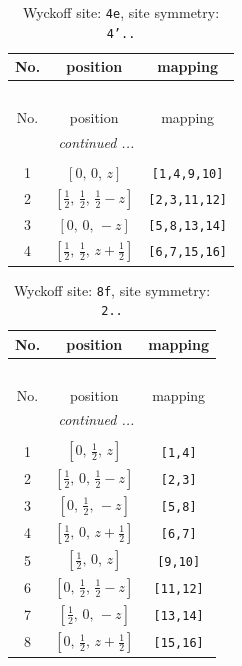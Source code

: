 \documentclass[fleqn,8pt]{jsarticle}
\begin{document}
\renewcommand{\arraystretch}{1.2}
\begin{longtable}{ccc}
\caption{Wyckoff site: {\tt 4e}, site symmetry: {\tt 4'..}}
 \\
 \hline \hline
No. & position & mapping \\ \hline \endfirsthead

\multicolumn{2}{l}{\tablename\ \thetable{}} \\
 \hline \hline
No. & position & mapping \\ \hline \endhead

 \hline \hline
\multicolumn{2}{r}{\footnotesize\it continued ...} \\ \endfoot

 \hline \hline
\multicolumn{2}{r}{} \\ \endlastfoot

1 & $\left[ 0,\, 0,\, z \right]$ & {\tt [1,4,9,10]} \\ \hline
2 & $\left[ \frac{1}{2},\, \frac{1}{2},\, \frac{1}{2} - z \right]$ & {\tt [2,3,11,12]} \\ \hline
3 & $\left[ 0,\, 0,\, - z \right]$ & {\tt [5,8,13,14]} \\ \hline
4 & $\left[ \frac{1}{2},\, \frac{1}{2},\, z + \frac{1}{2} \right]$ & {\tt [6,7,15,16]} \\
\end{longtable}
\renewcommand{\arraystretch}{1.2}
\begin{longtable}{ccc}
\caption{Wyckoff site: {\tt 8f}, site symmetry: {\tt 2..}}
 \\
 \hline \hline
No. & position & mapping \\ \hline \endfirsthead

\multicolumn{2}{l}{\tablename\ \thetable{}} \\
 \hline \hline
No. & position & mapping \\ \hline \endhead

 \hline \hline
\multicolumn{2}{r}{\footnotesize\it continued ...} \\ \endfoot

 \hline \hline
\multicolumn{2}{r}{} \\ \endlastfoot

1 & $\left[ 0,\, \frac{1}{2},\, z \right]$ & {\tt [1,4]} \\ \hline
2 & $\left[ \frac{1}{2},\, 0,\, \frac{1}{2} - z \right]$ & {\tt [2,3]} \\ \hline
3 & $\left[ 0,\, \frac{1}{2},\, - z \right]$ & {\tt [5,8]} \\ \hline
4 & $\left[ \frac{1}{2},\, 0,\, z + \frac{1}{2} \right]$ & {\tt [6,7]} \\ \hline
5 & $\left[ \frac{1}{2},\, 0,\, z \right]$ & {\tt [9,10]} \\ \hline
6 & $\left[ 0,\, \frac{1}{2},\, \frac{1}{2} - z \right]$ & {\tt [11,12]} \\ \hline
7 & $\left[ \frac{1}{2},\, 0,\, - z \right]$ & {\tt [13,14]} \\ \hline
8 & $\left[ 0,\, \frac{1}{2},\, z + \frac{1}{2} \right]$ & {\tt [15,16]} \\
\end{longtable}
\end{document}
